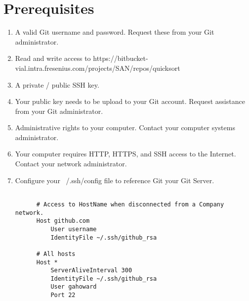 \clearpage
\section{Prerequisites}
\begin{enumerate}
  \item A valid Git username and password.  Request these from your Git administrator.

  \item Read and write access to https://bitbucket-vial.intra.fresenius.com/projects/SAN/repos/quicksort

  \item A private / public SSH key.

  \item Your public key needs to be upload to your Git account.  Request
    assistance from your Git administrator.

  \item Administrative rights to your computer.  Contact your computer systems
    administrator.

  \item Your computer requires HTTP, HTTPS, and SSH access to the Internet.
    Contact your network administrator.

  \item Configure your ~/.ssh/config file to reference Git your Git Server.

  \begin{verbatim}

      # Access to HostName when disconnected from a Company network.
      Host github.com 
          User username
          IdentityFile ~/.ssh/github_rsa

      # All hosts
      Host *
          ServerAliveInterval 300
          IdentityFile ~/.ssh/github_rsa
          User gahoward
          Port 22
          
  \end{verbatim}

\end{enumerate}
